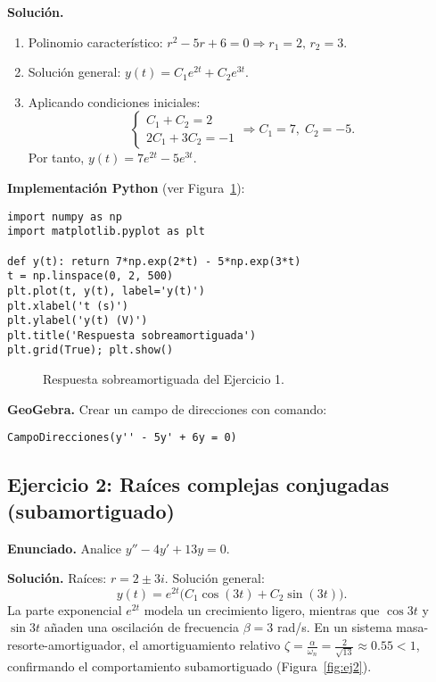\documentclass[stu,12pt,a4paper,hidelinks]{apa7}
\begin{document}
\textbf{Solución.}
\begin{enumerate}[label=\arabic*.]
  \item Polinomio característico: $r^2-5r+6=0\Rightarrow r_1=2,\,r_2=3$.
  \item Solución general: $y(t)=C_1 e^{2t}+C_2 e^{3t}$.
  \item Aplicando condiciones iniciales:
  \[
  \begin{cases}
  C_1+C_2=2\\
  2C_1+3C_2=-1
  \end{cases}
  \Rightarrow C_1=7,\;C_2=-5.
  \]
  Por tanto, $y(t)=7e^{2t}-5e^{3t}$.
\end{enumerate}

\textbf{Implementación Python} (ver Figura~\ref{fig:ej1}):
\begin{lstlisting}
import numpy as np
import matplotlib.pyplot as plt

def y(t): return 7*np.exp(2*t) - 5*np.exp(3*t)
t = np.linspace(0, 2, 500)
plt.plot(t, y(t), label='y(t)')
plt.xlabel('t (s)')
plt.ylabel('y(t) (V)')
plt.title('Respuesta sobreamortiguada')
plt.grid(True); plt.show()
\end{lstlisting}

\begin{figure}[H]
\centering
\caption{Respuesta sobreamortiguada del Ejercicio 1.}
\label{fig:ej1}
\end{figure}

\textbf{GeoGebra.} Crear un campo de direcciones con comando:
\begin{verbatim}
CampoDirecciones(y'' - 5y' + 6y = 0)
\end{verbatim}

\subsection{Ejercicio 2: Raíces complejas conjugadas (subamortiguado)}
\textbf{Enunciado.} Analice $y''-4y'+13y=0$.

\textbf{Solución.}
Raíces: $r=2\pm 3i$. Solución general:
\[
y(t)=e^{2t}\bigl(C_1\cos(3t)+C_2\sin(3t)\bigr).
\]
La parte exponencial $e^{2t}$ modela un crecimiento ligero, mientras que $\cos 3t$ y $\sin 3t$ añaden una oscilación de frecuencia $\beta=3$ rad/s. En un sistema masa-resorte-amortiguador, el amortiguamiento relativo $\zeta=\frac{\alpha}{\omega_n}=\frac{2}{\sqrt{13}}\approx 0.55<1$, confirmando el comportamiento subamortiguado (Figura~\ref{fig:ej2}).
\end{document}
